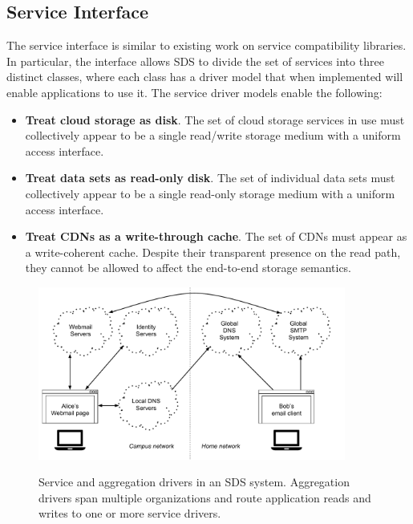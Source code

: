 \subsection{Service Interface}

The service interface is similar to existing work on service compatibility
libraries.  In particular, the interface allows SDS to divide the set of
services into three distinct classes, where each class has a driver model that
when implemented will enable applications to use it.  The service driver models
enable the following:

\begin{itemize}
   \item \textbf{Treat cloud storage as disk}.  The set of cloud storage
      services in use must collectively appear to be a single
      read/write storage medium with a uniform access interface.
   \item \textbf{Treat data sets as read-only disk}.  The set of individual
      data sets must collectively appear to be a single read-only
      storage medium with a uniform access interface.
   \item \textbf{Treat CDNs as a write-through cache}.  The set of CDNs
      must appear as a write-coherent cache.  Despite their transparent presence
      on the read path, they cannot be allowed to affect the end-to-end storage
      semantics.
\end{itemize}


\begin{figure}[h]
   \caption{Service and aggregation drivers in an SDS system.  Aggregation
   drivers span multiple organizations and route application reads and writes to
   one or more service drivers.}
   \centering
   \includegraphics[width=0.9\textwidth,page=3]{figures/dissertation-figures}
   \label{fig:chap2-driver-overview}
\end{figure}

